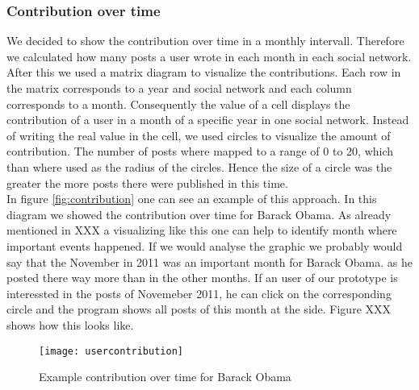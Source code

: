\subsubsection{Contribution over time}
We decided to show the contribution over time in a monthly intervall. Therefore we calculated how many posts a user wrote in each month in each social network. 
After this we  used a matrix diagram to visualize the contributions. Each row in the matrix corresponds to a year and social network and each column corresponds to a month. Consequently the value of a cell displays the contribution of a user in a month of a specific year in one social network. Instead of writing the real value in the cell, we used circles to visualize the amount of contribution. The number of posts where mapped to a range of 0 to 20, which than where used as the radius of the circles. Hence the size of a circle was the greater the more posts there were published in this time.  \\
In figure \ref{fig:contribution} one can see an example of this approach. In this diagram we showed the contribution over time for Barack Obama. As already mentioned in XXX a visualizing like this one can help to identify month where important events happened. If we would analyse the graphic we probably would say that the November in 2011 was an important month for Barack Obama. as he posted there way more than in the other months. If an user of our prototype is interessted in the posts of Novemeber 2011, he can click on the corresponding circle and the program shows all posts of this month at the side. Figure XXX shows how this looks like.  

\begin{figure}[t]
	\centering
	\texttt{[image: usercontribution]}
	\caption[ContributonOverTime]{Example contribution over time for Barack Obama}
	\label{fig:contributon}
\end{figure}

